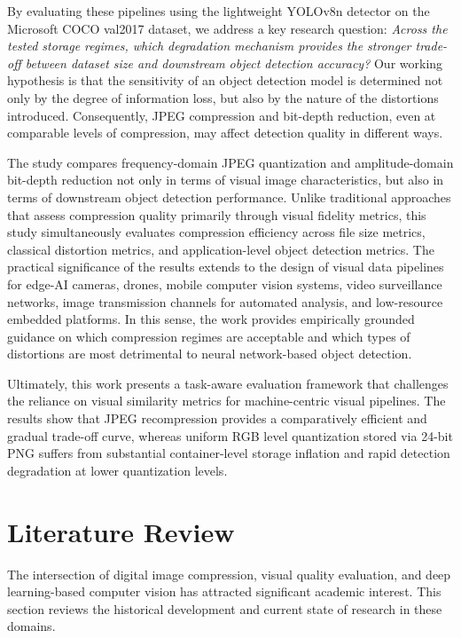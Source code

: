 \documentclass[12pt, a4paper]{article}
\begin{document}
By evaluating these pipelines using the lightweight YOLOv8n detector on the Microsoft COCO val2017 dataset, we address a key research question: \textit{Across the tested storage regimes, which degradation mechanism provides the stronger trade-off between dataset size and downstream object detection accuracy?} Our working hypothesis is that the sensitivity of an object detection model is determined not only by the degree of information loss, but also by the nature of the distortions introduced. Consequently, JPEG compression and bit-depth reduction, even at comparable levels of compression, may affect detection quality in different ways.

The study compares frequency-domain JPEG quantization and amplitude-domain bit-depth reduction not only in terms of visual image characteristics, but also in terms of downstream object detection performance. Unlike traditional approaches that assess compression quality primarily through visual fidelity metrics, this study simultaneously evaluates compression efficiency across file size metrics, classical distortion metrics, and application-level object detection metrics. The practical significance of the results extends to the design of visual data pipelines for edge-AI cameras, drones, mobile computer vision systems, video surveillance networks, image transmission channels for automated analysis, and low-resource embedded platforms. In this sense, the work provides empirically grounded guidance on which compression regimes are acceptable and which types of distortions are most detrimental to neural network-based object detection.

Ultimately, this work presents a task-aware evaluation framework that challenges the reliance on visual similarity metrics for machine-centric visual pipelines. The results show that JPEG recompression provides a comparatively efficient and gradual trade-off curve, whereas uniform RGB level quantization stored via 24-bit PNG suffers from substantial container-level storage inflation and rapid detection degradation at lower quantization levels.

\section{Literature Review}
The intersection of digital image compression, visual quality evaluation, and deep learning-based computer vision has attracted significant academic interest. This section reviews the historical development and current state of research in these domains.
\end{document}
